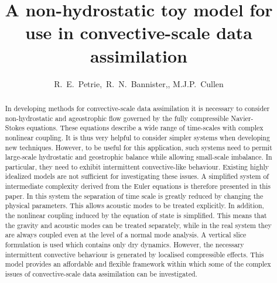 \documentclass[times]{qjrms4}
\begin{document}

\title{A non-hydrostatic toy model for use in convective-scale data assimilation}%

\author{R.~E.~Petrie,\corrauth\
R.~N.~Bannister,, M.J.P.~Cullen }

\address{ Department of Meteorology, University of Reading, UK
\\
 UK Met Office, Fitzroy Road, Exeter}
%

\begin{abstract}
In developing methods for convective-scale data assimilation it is necessary to consider
non-hydrostatic and ageostrophic flow governed by the fully compressible Navier-Stokes equations. These equations describe a wide range of time-scales with complex nonlinear coupling. It is thus very helpful to consider simpler systems when developing new techniques. However, to be useful for this application, such systems need to permit 
large-scale hydrostatic and geostrophic balance while allowing small-scale imbalance. In particular, they need to
exhibit intermittent convective-like behaviour.  Existing highly idealized models are not sufficient
 for investigating these issues.  A simplified system of intermediate complexity derived from the Euler equations is therefore presented in this paper. In this system the separation of time scale is greatly reduced by changing the physical parameters. This allows acoustic modes to be treated explicitly. In addition, the nonlinear coupling induced by the equation of state is simplified. This means that the gravity and acoustic modes can be treated separately, while in the real system they are always coupled even at the level of a normal mode analysis. A vertical slice formulation is used which contains only dry dynamics. However, the necessary intermittent convective behaviour is generated by localised compressible effects.
This model provides an affordable and flexible framework within which some of the complex issues 
of convective-scale data assimilation can be investigated.
 
\end{abstract}
\end{document}
